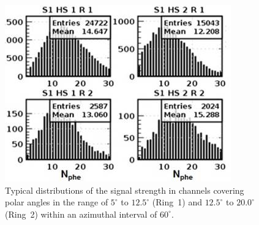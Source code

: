 \begin{figure}[!ht]
    \centering
    \includegraphics[width=1.0\linewidth,trim={0.0cm 0.0cm 0.0cm 0.0cm},clip]{images/Signal_S1_HS1_HS2_R1_R2.jpg}
    \caption{Typical distributions of the signal strength in channels covering polar angles in the range of $5^\circ$ to
      $12.5^\circ$ (Ring~1) and $12.5^\circ$ to $20.0^\circ$ (Ring~2) within an azimuthal interval of $60^\circ$.}
    \label{fig:Signal_S1_HS1_HS2_R1_R2}
\end{figure}

